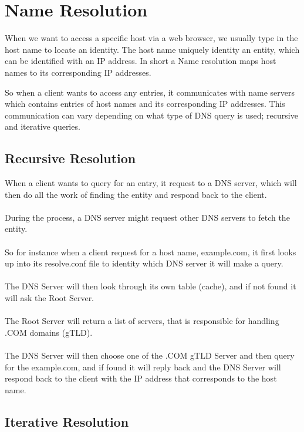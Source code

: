 \documentclass[14pt]{article}
\begin{document}
\section{Name Resolution}

When we want to access a specific host via a web browser, we usually type in the host name to locate an identity. The host name uniquely identity an entity, which can be identified with an IP address. In short a Name resolution maps host names to its corresponding IP addresses. 

So when a client wants to access any entries, it communicates with name servers which contains entries  of host names and its corresponding IP addresses. This communication can vary depending on what type of DNS query is used; recursive and iterative queries. 

\subsection{Recursive Resolution}

When a client wants to query for an entry, it request to a DNS server, which will then do all the work of finding the entity and respond back to the client. \\\\During the process, a DNS server might request other DNS servers to fetch the entity. \\\\So for instance when a client request for a host name, example.com, it first looks up into its resolve.conf file to identity which DNS server it will make a query.  \\\\The DNS Server will then look through its own table (cache), and if not found it will ask the Root Server. \\\\The Root Server will return a list of servers, that is responsible for handling .COM domains (gTLD). \\\\The DNS Server will then choose one of the .COM gTLD Server and then query for the example.com, and if found it will reply back and the DNS Server will respond back to the client with the IP address that corresponds to the host name.

\subsection{Iterative Resolution}
\end{document}
